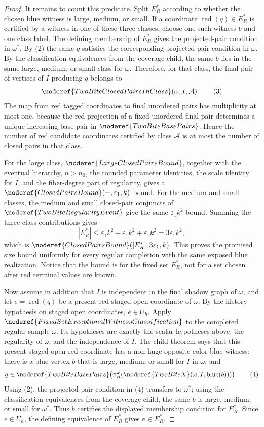 \begin{proof}
It remains to count this predicate.  Split \(E_R^\ast\) according to whether
the chosen blue witness is large, medium, or small.  If a coordinate
\(\operatorname{red}(q)\in E_R^\ast\) is certified by a witness in one of
these three classes, choose one such witness \(b\) and one class label.  The
defining membership of \(E_R^\ast\) gives the projected-pair condition in
\(\omega^\ast\).  By (2) the same \(q\) satisfies the corresponding
projected-pair condition in \(\omega\).  By the classification equivalences
from the coverage child, the same \(b\) lies in the same large, medium, or
small class for \(\omega\).  Therefore, for that class, the final pair of
vertices of \(I\) producing \(q\) belongs to
\[
\noderef{TwoBiteClosedPairsInClass}(\omega,I,\mathcal A).
\tag{3}
\]
The map from red tagged coordinates to final unordered pairs has
multiplicity at most one, because the red projection of a fixed unordered
final pair determines a unique increasing base pair in
\(\noderef{TwoBiteBasePairs}\).  Hence the number of red candidate
coordinates certified by class \(\mathcal A\) is at most the number of
closed pairs in that class.

For the large class, \(\noderef{LargeClosedPairsBound}\), together with the
eventual hierarchy, \(n>n_0\), the rounded parameter identities, the scale
identity for \(I\), and the fiber-degree part of regularity, gives a
\(\noderef{ClosedPairsBound}(-,\varepsilon_1,k)\) bound.  For the medium and
small classes, the medium and small closed-pair conjuncts of
\(\noderef{TwoBiteRegularityEvent}\) give the same
\(\varepsilon_1k^2\) bound.  Summing the three class contributions gives
\[
|E_R^\ast|\le
\varepsilon_1k^2+\varepsilon_1k^2+\varepsilon_1k^2
=3\varepsilon_1k^2,
\]
which is
\(\noderef{ClosedPairsBound}(|E_R^\ast|,3\varepsilon_1,k)\).
This proves the promised size bound uniformly for every regular completion
with the same exposed blue realization.  Notice that the bound is for the
fixed set \(E_R^\ast\), not for a set chosen after red terminal values are
known.

Now assume in addition that \(I\) is independent in the final shadow graph of
\(\omega\), and let \(e=\operatorname{red}(q)\) be a present red
staged-open coordinate of \(\omega\).  By the history hypothesis on staged
open coordinates, \(e\in U_h\).  Apply
\(\noderef{FixedSetExceptionalWitnessClassification}\) to the completed
regular sample \(\omega\).  Its hypotheses are exactly the scalar
hypotheses above, the regularity of \(\omega\), and the independence of
\(I\).  The child theorem says that this present staged-open red coordinate
has a non-huge opposite-color blue witness: there is a blue vertex \(b\) that
is large, medium, or small for \(I\) in \(\omega\), and
\[
q\in\noderef{TwoBiteBasePairs}
\bigl(\pi_R^\omega
(\noderef{TwoBiteX}(\omega,I,\operatorname{blue}(b)))\bigr).
\tag{4}
\]
Using (2), the projected-pair condition in (4) transfers to
\(\omega^\ast\); using the classification equivalences from the coverage
child, the same \(b\) is large, medium, or small for
\(\omega^\ast\).  Thus \(b\) certifies the displayed membership condition
for \(E_R^\ast\).  Since \(e\in U_h\), the defining equivalence of
\(E_R^\ast\) gives \(e\in E_R^\ast\).


\end{proof}
